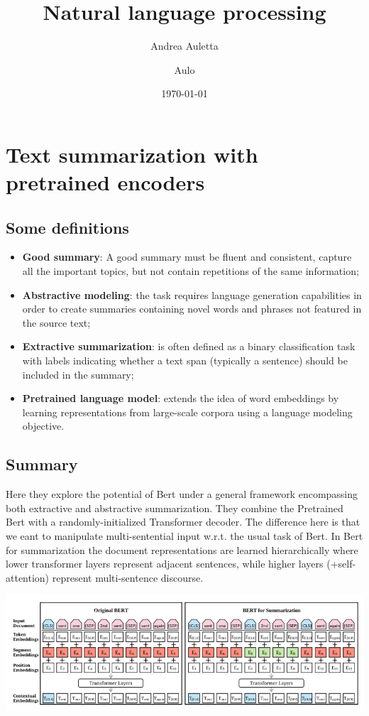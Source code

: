 \documentclass[12pt]{article}
\title{Natural language processing}
\author{
    Andrea Auletta
    \and
    Aulo
}
\date{\today}
\begin{document}
\maketitle
\tableofcontents
\newpage


\section{Text summarization with pretrained encoders}
\subsection{Some definitions}
\begin{itemize}
    \item \textbf{Good summary}: A good summary must be fluent and consistent, capture all the important topics, but not contain repetitions 
    of the same information;
    \item \textbf{Abstractive modeling}: the task requires language generation capabilities in order to create 
    summaries containing novel words and phrases not featured in the source text;
    \item \textbf{Extractive summarization}: is often defined as a binary classification task with labels 
    indicating whether a text span (typically a sentence) should be included in the summary;
    \item \textbf{Pretrained language model}: extends the idea of word embeddings by learning representations
    from large-scale corpora using a language modeling objective.
\end{itemize}
\subsection{Summary}
Here they explore the potential of Bert under a general framework encompassing both extractive 
and abstractive summarization. They combine the Pretrained Bert with a randomly-initialized Transformer 
decoder. The difference here is that we eant to manipulate multi-sentential input w.r.t. the usual task of Bert.
In Bert for summarization the document representations are learned hierarchically where lower transformer layers
represent adjacent sentences, while higher layers (+self-attention) represent multi-sentence discourse.
\begin{center}
    \includegraphics[scale=0.6]{./img/bert.png}
\end{center}
\end{document}
